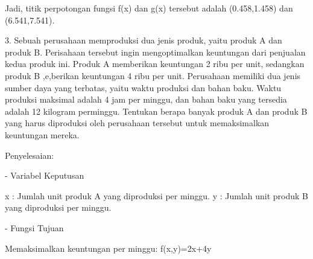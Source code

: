 \documentclass{article}
\begin{document}
\begin{eulernotebook}
\begin{eulercomment}
\begin{eulercomment}
\begin{eulercomment}
\begin{eulercomment}
\begin{eulercomment}
Jadi, titik perpotongan fungsi f(x) dan g(x) tersebut adalah
(0.458,1.458) dan (6.541,7.541).

3. Sebuah perusahaan memproduksi dua jenis produk, yaitu produk A dan
produk B. Perisahaan tersebut ingin mengoptimalkan keuntungan dari
penjualan kedua produk ini. Produk A memberikan keuntungan 2 ribu per
unit, sedangkan produk B ,e,berikan keuntungan 4 ribu per unit.
Perusahaan memiliki dua jenis sumber daya yang terbatas, yaitu waktu
produksi dan bahan baku. Waktu produksi maksimal adalah 4 jam per
minggu, dan bahan baku yang tersedia adalah 12 kilogram perminggu.
Tentukan berapa banyak produk A dan produk B yang harus diproduksi
oleh perusahaan tersebut untuk memaksimalkan keuntungan mereka.

Penyelesaian:

- Variabel Keputusan\\
\end{eulercomment}
\begin{eulerttcomment}
  x : Jumlah unit produk A yang diproduksi per minggu.
  y : Jumlah unit produk B yang diproduksi per minggu.
\end{eulerttcomment}
\begin{eulercomment}

- Fungsi Tujuan\\
\end{eulercomment}
\begin{eulerttcomment}
  Memaksimalkan keuntungan per minggu: f(x,y)=2x+4y
\end{eulerttcomment}
\begin{eulercomment}


\end{eulercomment}
\end{eulercomment}
\end{eulercomment}
\end{eulercomment}
\end{eulercomment}
\end{eulernotebook}
\end{document}
